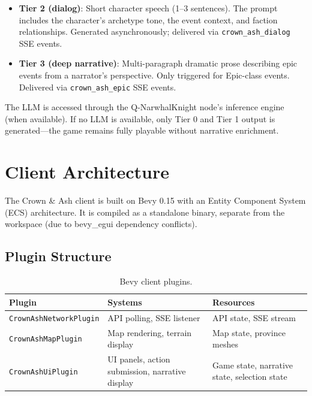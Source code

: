 \documentclass[a4paper, 11pt]{article}
\begin{document}
\begin{itemize}
  \item \textbf{Tier 2 (dialog)}: Short character speech (1--3 sentences).
    The prompt includes the character's archetype tone, the event context,
    and faction relationships. Generated asynchronously; delivered via
    \texttt{crown\_ash\_dialog} SSE events.
  \item \textbf{Tier 3 (deep narrative)}: Multi-paragraph dramatic prose
    describing epic events from a narrator's perspective. Only triggered for
    Epic-class events. Delivered via \texttt{crown\_ash\_epic} SSE events.
\end{itemize}

The LLM is accessed through the Q-NarwhalKnight node's inference engine
(when available). If no LLM is available, only Tier 0 and Tier 1 output
is generated---the game remains fully playable without narrative enrichment.


\section{Client Architecture}
\label{sec:client}

The Crown \& Ash client is built on Bevy 0.15 with an Entity Component System
(ECS) architecture. It is compiled as a standalone binary, separate from the
workspace (due to bevy\_egui dependency conflicts).

\subsection{Plugin Structure}

\begin{table}[htbp]
\centering
\caption{Bevy client plugins.}
\label{tab:plugins}
\begin{tabular}{@{}lp{4cm}p{5cm}@{}}
\toprule
\textbf{Plugin} & \textbf{Systems} & \textbf{Resources} \\
\midrule
\texttt{CrownAshNetworkPlugin} & API polling, SSE listener & API state, SSE stream \\
\texttt{CrownAshMapPlugin}     & Map rendering, terrain display & Map state, province meshes \\
\texttt{CrownAshUiPlugin}      & UI panels, action submission, narrative display & Game state, narrative state, selection state \\
\bottomrule
\end{tabular}
\end{table}
\end{document}
